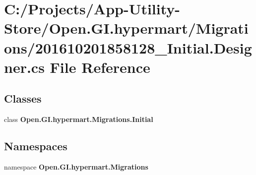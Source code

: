 \section{C\+:/\+Projects/\+App-\/\+Utility-\/\+Store/\+Open.G\+I.\+hypermart/\+Migrations/201610201858128\+\_\+\+Initial.Designer.\+cs File Reference}
\label{201610201858128___initial_8_designer_8cs}
\subsection*{Classes}
\begin{DoxyCompactItemize}
\item 
class \textbf{ Open.\+G\+I.\+hypermart.\+Migrations.\+Initial}
\end{DoxyCompactItemize}
\subsection*{Namespaces}
\begin{DoxyCompactItemize}
\item 
namespace \textbf{ Open.\+G\+I.\+hypermart.\+Migrations}
\end{DoxyCompactItemize}
